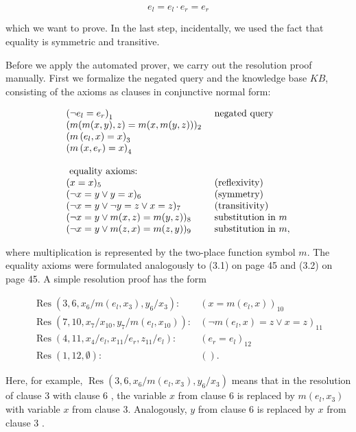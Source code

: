 \documentclass[10pt]{book}
\begin{document}
$$
e_{l}=e_{l} \cdot e_{r}=e_{r}
$$

which we want to prove. In the last step, incidentally, we used the fact that equality is symmetric and transitive.

Before we apply the automated prover, we carry out the resolution proof manually. First we formalize the negated query and the knowledge base $K B$, consisting of the axioms as clauses in conjunctive normal form:

$$
\begin{array}{ll}
\left(\neg e_{l}=e_{r}\right)_{1} & \text { negated query } \\
(m(m(x, y), z)=m(x, m(y, z)))_{2} & \\
\left(m\left(e_{l}, x\right)=x\right)_{3} & \\
\left(m\left(x, e_{r}\right)=x\right)_{4} & \\\index{A priori probability}\index{Independent}
& \\
\text { equality axioms: } & \\
(x=x)_{5} & \text { (reflexivity) } \\
(\neg x=y \vee y=x)_{6} & \text { (symmetry) } \\
(\neg x=y \vee \neg y=z \vee x=z)_{7} & \text { (transitivity) } \\
(\neg x=y \vee m(x, z)=m(y, z))_{8} & \text { substitution in } m \\
(\neg x=y \vee m(z, x)=m(z, y))_{9} & \text { substitution in } m,
\end{array}
$$

where multiplication is represented by the two-place function symbol $m$. The equality axioms were formulated analogously to (3.1) on page 45 and (3.2) on page 45. A simple resolution proof has the form

$$
\begin{array}{ll}
\operatorname{Res}\left(3,6, x_{6} / m\left(e_{l}, x_{3}\right), y_{6} / x_{3}\right): & \left(x=m\left(e_{l}, x\right)\right)_{10} \\
\operatorname{Res}\left(7,10, x_{7} / x_{10}, y_{7} / m\left(e_{l}, x_{10}\right)\right): & \left(\neg m\left(e_{l}, x\right)=z \vee x=z\right)_{11} \\
\operatorname{Res}\left(4,11, x_{4} / e_{l}, x_{11} / e_{r}, z_{11} / e_{l}\right): & \left(e_{r}=e_{l}\right)_{12} \\
\operatorname{Res}(1,12, \emptyset): & () .
\end{array}
$$

Here, for example, $\operatorname{Res}\left(3,6, x_{6} / m\left(e_{l}, x_{3}\right), y_{6} / x_{3}\right)$ means that in the resolution of clause 3 with clause 6 , the variable $x$ from clause 6 is replaced by $m\left(e_{l}, x_{3}\right)$ with variable $x$ from clause 3. Analogously, $y$ from clause 6 is replaced by $x$ from clause 3 .
\end{document}
